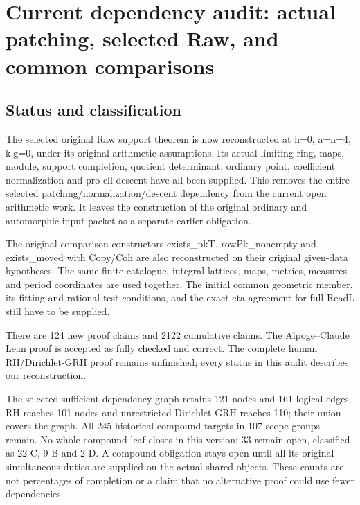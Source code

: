 \section{Current dependency audit: actual patching, selected Raw, and common comparisons}

\label{sec:dependency-audit-v40}

\subsection{Status and classification}

The selected original Raw support theorem is now reconstructed at h=0, a=n=4, k.g=0, under its original arithmetic assumptions. Its actual limiting ring, maps, module, support completion, quotient determinant, ordinary point, coefficient normalization and pro-ell descent have all been supplied. This removes the entire selected patching/\allowbreak{}normalization/\allowbreak{}descent dependency from the current open arithmetic work. It leaves the construction of the original ordinary and automorphic input packet as a separate earlier obligation.

The original comparison constructors exists\_\allowbreak{}pkT, rowPk\_\allowbreak{}nonempty and exists\_\allowbreak{}moved with Copy/\allowbreak{}Coh are also reconstructed on their original given-data hypotheses. The same finite catalogue, integral lattices, maps, metrics, measures and period coordinates are used together. The initial common geometric member, its fitting and rational-test conditions, and the exact eta agreement for full ReadL still have to be supplied.

There are 124 new proof claims and 2122 cumulative claims. The Alpoge–Claude Lean proof is accepted as fully checked and correct. The complete human RH/\allowbreak{}Dirichlet-GRH proof remains unfinished; every status in this audit describes our reconstruction.

The selected sufficient dependency graph retains 121 nodes and 161 logical edges. RH reaches 101 nodes and unrestricted Dirichlet GRH reaches 110; their union covers the graph. All 245 historical compound targets in 107 scope groups remain. No whole compound leaf closes in this version: 33 remain open, classified as 22 C, 9 B and 2 D. A compound obligation stays open until all its original simultaneous duties are supplied on the actual shared objects. These counts are not percentages of completion or a claim that no alternative proof could use fewer dependencies.

